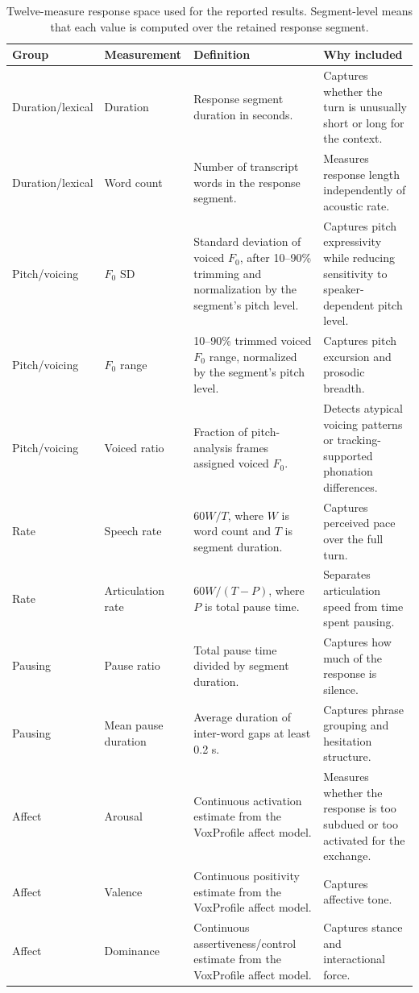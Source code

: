 \documentclass[conference]{IEEEtran}
\begin{document}
\begin{table}[t]
\centering
\caption{Twelve-measure response space used for the reported results. Segment-level means that each value is computed over the retained response segment.}
\label{tab:target_metrics}
\scriptsize
\setlength{\tabcolsep}{4pt}
\begin{tabular}{p{}p{}p{}p{}}
\toprule
Group & Measurement & Definition & Why included \\
\midrule
Duration/lexical & Duration & Response segment duration in seconds. & Captures whether the turn is unusually short or long for the context. \\
Duration/lexical & Word count & Number of transcript words in the response segment. & Measures response length independently of acoustic rate. \\
Pitch/voicing & $F_0$ SD & Standard deviation of voiced $F_0$, after 10--90\% trimming and normalization by the segment's pitch level. & Captures pitch expressivity while reducing sensitivity to speaker-dependent pitch level. \\
Pitch/voicing & $F_0$ range & 10--90\% trimmed voiced $F_0$ range, normalized by the segment's pitch level. & Captures pitch excursion and prosodic breadth. \\
Pitch/voicing & Voiced ratio & Fraction of pitch-analysis frames assigned voiced $F_0$. & Detects atypical voicing patterns or tracking-supported phonation differences. \\
Rate & Speech rate & $60W/T$, where $W$ is word count and $T$ is segment duration. & Captures perceived pace over the full turn. \\
Rate & Articulation rate & $60W/(T-P)$, where $P$ is total pause time. & Separates articulation speed from time spent pausing. \\
Pausing & Pause ratio & Total pause time divided by segment duration. & Captures how much of the response is silence. \\
Pausing & Mean pause duration & Average duration of inter-word gaps at least 0.2 s. & Captures phrase grouping and hesitation structure. \\
Affect & Arousal & Continuous activation estimate from the VoxProfile affect model. & Measures whether the response is too subdued or too activated for the exchange. \\
Affect & Valence & Continuous positivity estimate from the VoxProfile affect model. & Captures affective tone. \\
Affect & Dominance & Continuous assertiveness/control estimate from the VoxProfile affect model. & Captures stance and interactional force. \\
\bottomrule
\end{tabular}
\end{table}
\end{document}
